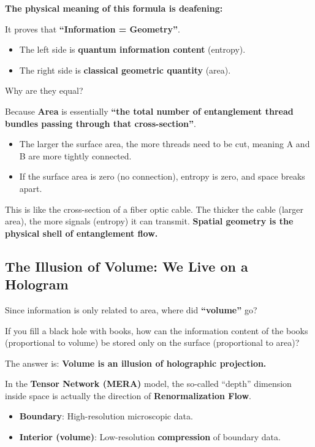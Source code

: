 \textbf{The physical meaning of this formula is deafening:}

It proves that \textbf{``Information = Geometry''}.

\begin{itemize}
\item The left side is \textbf{quantum information content} (entropy).

\item The right side is \textbf{classical geometric quantity} (area).
\end{itemize}

Why are they equal?

Because \textbf{Area} is essentially \textbf{``the total number of entanglement thread bundles passing through that cross-section''}.

\begin{itemize}
\item The larger the surface area, the more threads need to be cut, meaning A and B are more tightly connected.

\item If the surface area is zero (no connection), entropy is zero, and space breaks apart.
\end{itemize}

This is like the cross-section of a fiber optic cable. The thicker the cable (larger area), the more signals (entropy) it can transmit. \textbf{Spatial geometry is the physical shell of entanglement flow.}

\subsection{The Illusion of Volume: We Live on a Hologram}

Since information is only related to area, where did \textbf{``volume''} go?

If you fill a black hole with books, how can the information content of the books (proportional to volume) be stored only on the surface (proportional to area)?

The answer is: \textbf{Volume is an illusion of holographic projection.}

In the \textbf{Tensor Network (MERA)} model, the so-called ``depth'' dimension inside space is actually the direction of \textbf{Renormalization Flow}.

\begin{itemize}
\item \textbf{Boundary}: High-resolution microscopic data.

\item \textbf{Interior (volume)}: Low-resolution \textbf{compression} of boundary data.
\end{itemize}

